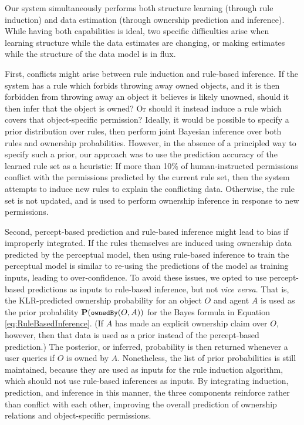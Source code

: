 \documentclass[letterpaper]{article} %
\begin{document}
Our system simultaneously performs both structure learning (through rule induction) and data estimation (through ownership prediction and inference). While having both capabilities is ideal, two specific difficulties arise when learning structure while the data estimates are changing, or making estimates while the structure of the data model is in flux.

First, conflicts might arise between rule induction and rule-based inference. If the system has a rule which forbids throwing away owned objects, and it is then forbidden from throwing away an object it believes is likely unowned, should it then infer that the object is owned? Or should it instead induce a rule which covers that object-specific permission? Ideally, it would be possible to specify a prior distribution over rules, then perform joint Bayesian inference over both rules and ownership probabilities. However, in the absence of a principled way to specify such a prior, our approach was to use the prediction accuracy of the learned rule set as a heuristic: If more than 10\% of human-instructed permissions conflict with the permissions predicted by the current rule set, then the system attempts to induce new rules to explain the conflicting data. Otherwise, the rule set is not updated, and is used to perform ownership inference in response to new permissions.

Second, percept-based prediction and rule-based inference might lead to bias if improperly integrated. If the rules themselves are induced using ownership data predicted by the perceptual model, then using rule-based inference to train the perceptual model is similar to re-using the predictions of the model as training inputs, leading to over-confidence. To avoid these issues, we opted to use percept-based predictions as inputs to rule-based inference, but not \emph{vice versa}. That is, the KLR-predicted ownership probability for an object $O$ and agent $A$ is used as the prior probability $\small{\mathbf{P}(\texttt{ownedBy}(O,A))}$ for the Bayes formula in Equation \ref{eq:RuleBasedInference}. (If $A$ has made an explicit ownership claim over $O$, however, then that data is used as a prior instead of the percept-based prediction.) The posterior, or inferred, probability is then returned whenever a user queries if $O$ is owned by $A$. Nonetheless, the list of prior probabilities is still maintained, because they are used as inputs for the rule induction algorithm, which should not use rule-based inferences as inputs. By integrating induction, prediction, and inference in this manner, the three components reinforce rather than conflict with each other, improving the overall prediction of ownership relations and object-specific permissions.
\end{document}
